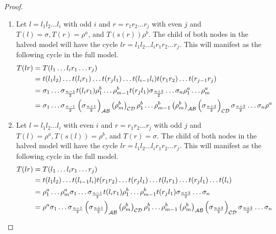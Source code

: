 \begin{proof} \phantom{x}
	\begin{enumerate}
		\item Let $l = l_1l_2 \dots l_i$ with odd $i$ and $r = r_1r_2 \dots r_j$ with even $j$ and $T(l) = \sigma, T(r) = \rho^a$, and $T(s(r))\rho^b$.
		      The child of both nodes in the halved model will have the cycle $lr = l_1l_2 \dots l_i r_1r_2 \dots r_j$.
		      This will manifest as the following cycle in the full model.
		      \begin{align*}
			      T(lr) & = T(l_1 \dots l_i r_1 \dots r_j)                                                      \\
			            & =
			      t(l_1l_2) \dots t(l_i r_1) \dots t(r_j l_1) \dots t(l_{i-1}l_i) t(r_1r_2) \dots t(r_{j-1}r_j) \\
			            & =
			      \sigma_1 \dots \sigma_{\frac{n-1}{2}} t(l_i r_1)
			      \rho^b_1 \dots \rho^b_{m-1} t(r_j l_1)
			      \sigma_{\frac{n+3}{2}} \dots \sigma_n
			      \rho^a_1 \dots \rho^a_m                                                                       \\
			            & =
			      \sigma_1 \dots \sigma_{\frac{n-1}{2}} \left(\sigma_{\frac{n+1}{2}}\right)_{\mathcal{A}\mathcal{B}} \left(\rho^b_m\right)_{\mathcal{C}\mathcal{D}}
			      \rho^b_1 \dots \rho^b_{m-1} \left(\rho^b_m\right)_{\mathcal{A}\mathcal{B}} \left(\sigma_{\frac{n+3}{2}}\right)_{\mathcal{C}\mathcal{D}}
			      \sigma_{\frac{n+3}{2}} \dots \sigma_n
			      \rho^a                                                                                        \\
		      \end{align*}
		\item Let $l = l_1l_2 \dots l_i$ with even $i$ and $r = r_1r_2 \dots r_j$ with odd $j$ and $T(l) = \rho^a, T(s(l)) = \rho^b$, and $T(r) = \sigma$.
		      The child of both nodes in the halved model will have the cycle $lr = l_1l_2 \dots l_i r_1r_2 \dots r_j$.
		      This will manifest as the following cycle in the full model.
		      \begin{align*}
			      T(lr) & = T(l_1 \dots l_i r_1 \dots r_j)                                                              \\
			            & =
			      t(l_1l_2) \dots t(l_{i-1}l_i) t(r_1r_2) \dots t(r_j l_1) \dots t(l_ir_1) \dots t(r_jl_1) \dots t(l_i) \\
			            & =
			      \rho^a_1 \dots \rho^a_m
			      \sigma_1 \dots \sigma_{\frac{n-1}{2}} t(l_i r_1)
			      \rho^b_1 \dots \rho^b_{m-1} t(r_j l_1)
			      \sigma_{\frac{n+3}{2}} \dots \sigma_n                                                                 \\
			            & =
			      \rho^a
			      \sigma_1 \dots \sigma_{\frac{n-1}{2}} \left(\sigma_{\frac{n+1}{2}}\right)_{\mathcal{A}\mathcal{B}} \left(\rho^b_m\right)_{\mathcal{C}\mathcal{D}}
			      \rho^b_1 \dots \rho^b_{m-1} \left(\rho^b_m\right)_{\mathcal{A}\mathcal{B}} \left(\sigma_{\frac{n+3}{2}}\right)_{\mathcal{C}\mathcal{D}}
			      \sigma_{\frac{n+3}{2}} \dots \sigma_n                                                                 \\
		      \end{align*}
	\end{enumerate}
\end{proof}

